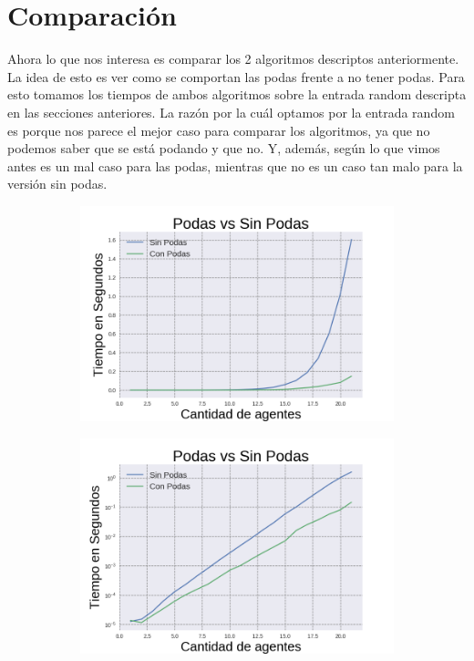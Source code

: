 \section{Comparación}
	
	Ahora lo que nos interesa es comparar los 2 algoritmos descriptos anteriormente. La idea de esto es ver como se comportan las podas frente a no tener podas. Para esto tomamos los tiempos de ambos algoritmos sobre la entrada random descripta en las secciones anteriores. La razón por la cuál optamos por la entrada random es porque nos parece el mejor caso para comparar los algoritmos, ya que no podemos saber que se está podando y que no. Y, además, según lo que vimos antes es un mal caso para las podas, mientras que no es un caso tan malo para la versión sin podas. 

\begin{figure}[h]
\begin{subfigure}{0.5\textwidth}
\includegraphics[scale=0.45]{Vs.png}
\end{subfigure}
\end{figure}

\begin{figure}[h]
\begin{subfigure}{0.5\textwidth}
\includegraphics[scale=0.45]{VsLog.png}
\end{subfigure}
\end{figure}
	
